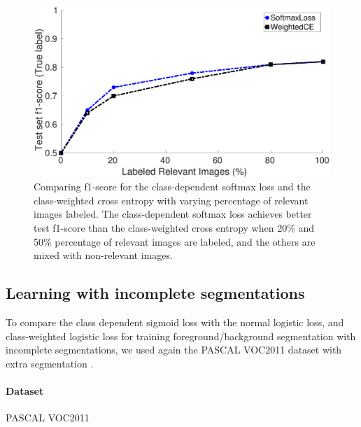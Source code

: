 \begin{figure}[t]
\centering
   \includegraphics[width=1.05\linewidth]{img/pu_vs_pn}
\caption{
Comparing f1-score for the class-dependent softmax loss and the class-weighted cross entropy with varying percentage of relevant images labeled.
The class-dependent softmax loss achieves better test f1-score than the class-weighted cross entropy when 20\% and 50\% percentage of relevant images are labeled, and the others are mixed with non-relevant images.
}
\label{fig:pct_annotating}
\end{figure}


\subsection{Learning with incomplete segmentations}
To compare the class dependent sigmoid loss with the normal logistic loss, and class-weighted logistic loss for training foreground/background segmentation with incomplete segmentations, we used again the PASCAL VOC2011 dataset with extra segmentation \cite{hariharan2011semantic}.

\paragraph{Dataset}
PASCAL VOC2011

